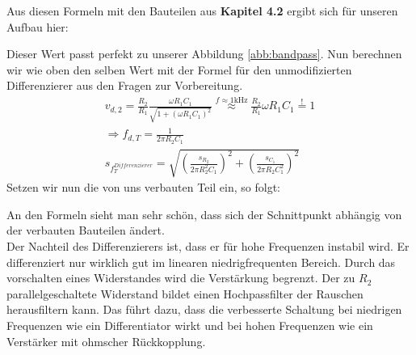 Aus diesen Formeln mit den Bauteilen aus \textbf{Kapitel 4.2} ergibt sich für unseren Aufbau hier:
\begin{center}
\end{center}
Dieser Wert passt perfekt zu unserer Abbildung \ref{abb:bandpass}.
Nun berechnen wir wie oben den selben Wert mit der Formel für den unmodifizierten Differenzierer aus den Fragen zur Vorbereitung.
\begin{gather}
    v_{d,2} = \frac{R_2}{R_1} \frac{\omega R_1C_1}{\sqrt{1 + (\omega R_1C_1)^2}} \overset{f \approx 1 \text{kHz}}{\approx} \frac{R_2}{R_1} \omega R_1C_1  \overset{!}{=} 1\\
    \Rightarrow f_{d,T} = \frac{1}{2 \pi R_2 C_1}\\
    s_{f_{T}^{Differenzierer}} = \sqrt{(\frac{s_{R_2}}{2 \pi R_{2}^2 C_1})^2+ (\frac{s_{C_1}}{2 \pi R_{2} C_{1}^2})^2}
\end{gather}
Setzen wir nun die von uns verbauten Teil ein, so folgt:
\begin{center}
\end{center}
An den Formeln sieht man sehr schön, dass sich der Schnittpunkt abhängig von der verbauten 
Bauteilen ändert.\\
Der Nachteil des Differenzierers ist, dass er für hohe Frequenzen instabil wird. Er differenziert nur 
wirklich gut im linearen niedrigfrequenten Bereich. Durch das vorschalten eines Widerstandes wird die Verstärkung begrenzt. 
Der zu $R_2$ parallelgeschaltete Widerstand bildet einen Hochpassfilter der Rauschen herausfiltern kann. 
Das führt dazu, dass die verbesserte Schaltung bei niedrigen Frequenzen wie ein Differentiator wirkt und bei hohen 
Frequenzen wie ein Verstärker mit ohmscher Rückkopplung.\footnotemark
{}

